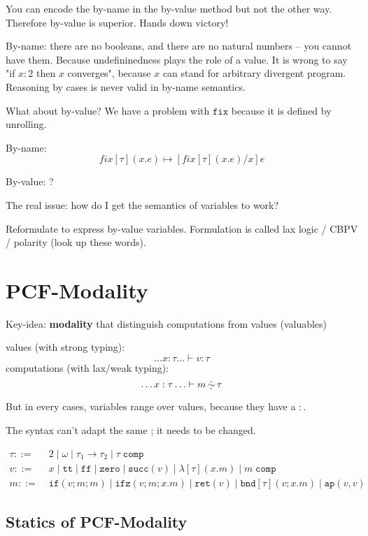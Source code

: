 \documentclass[11pt]{article}
\newcommand{\entails}{\ensuremath{\vdash}}
\newcommand{\dsym}{\ensuremath{\,\underaccent{\dot}{\dot{\sim}}\,}}
\newcommand{\Ltt}{\ensuremath{\mathtt{tt}}}
\newcommand{\Lff}{\ensuremath{\mathtt{ff}}}
\newcommand{\Lcomp}[1]{\ensuremath{#1\;\mathtt{comp}}}
\newcommand{\Lzero}{\ensuremath{\mathtt{zero}}}
\newcommand{\Lsucc}[1]{\ensuremath{\mathtt{succ}(#1)}}
\newcommand{\Lif}[3]{\ensuremath{\mathtt{if}(#1 ; #2 ; #3)}}
\newcommand{\Lifz}[3]{\ensuremath{\mathtt{ifz}(#1 ; #2 ; #3)}}
\newcommand{\Llam}[3][\tau]{\ensuremath{\lambda[#1](#2 . #3)}}
\newcommand{\Lap}[2]{\ensuremath{\mathtt{ap}(#1, #2)}}
\newcommand{\Lbind}{\ensuremath{\mathtt{bnd}}}
\newcommand{\rret}{\ensuremath{\mathtt{ret}}}
\newcommand{\LBnd}[3][\tau]{\ensuremath{\Lbind[#1](#2; #3)}}
\begin{document}
You can encode the by-name in the by-value method but not the other way.
Therefore by-value is superior. Hands down victory!

By-name: there are no booleans, and there are no natural numbers -- you
cannot have them.  Because undefininedness plays the role of a value.
It is wrong to say "if $x : 2$ then $x$ converges", because $x$ can stand for arbitrary divergent program.
Reasoning by cases is never valid in by-name semantics.

\vspace{1em}

What about by-value?
We have a problem with $\texttt{fix}$ because it is defined by unrolling.

By-name: $$fix[\tau](x.e)\mapsto [fix[\tau](x.e) / x]e$$

By-value: ?

The real issue: how do I get the semantics of variables to work?

Reformulate to express by-value variables.  Formulation is called lax
logic / CBPV / polarity (look up these words).

\section{PCF-Modality}

Key-idea: \textbf{modality} that distinguish computations from values (valuables)

values (with strong typing): $$\dots x : \tau \dots \entails v : \tau$$
computations (with lax/weak typing): $$\dots x : \tau \dots \entails m
\dsym \tau$$

But in every cases, variables range over values, because they have a
$\colon$.

The syntax can't adapt the same ; it needs to be changed.

\begin{align*}
  \tau ::= &\; 2 \mid \omega \mid \tau_{1}\rightarrow\tau_{2} \mid \Lcomp \tau
  \\
  v ::= &\; x \mid \Ltt \mid \Lff \mid \Lzero \mid \Lsucc v \mid \Llam{x}{m} \mid \Lcomp{m} \\
  m ::= &\; \Lif{v}{m}{m} \mid
            \Lifz{v}{m}{x.m} \mid
            \rret(v) \mid
            \LBnd{v}{x.m} \mid
            \Lap{v}{v}
\end{align*}

\subsection{Statics of PCF-Modality}
\label{sec:statics}
\end{document}

